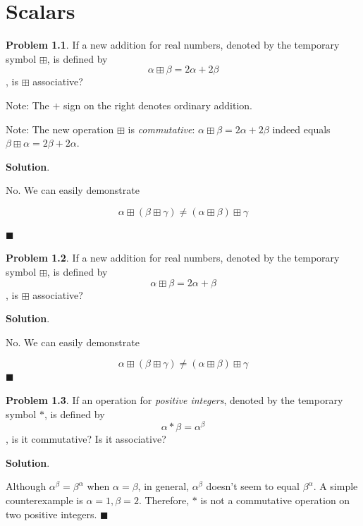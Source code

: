 \documentclass[english,notitlepage,smartquotes]{hgbreport}
\theoremstyle{definition}
\theoremstyle{problem}
\newtheorem{problem}{Problem}
\theoremstyle{remark}
\theoremstyle{plain}
\renewcommand\qedsymbol{$\blacksquare$}
\begin{document}
\tableofcontents

\chapter{Scalars}
\begin{problem}
\label{pr:2a2b}
If a new addition for real numbers, denoted by the temporary symbol $\boxplus$, is defined by
$$
\alpha\boxplus\beta=2\alpha+2\beta
$$
, is $\boxplus$ associative?

Note: The $+$ sign on the right denotes ordinary addition.

Note: The new operation $\boxplus$ is \textit{commutative}: $\alpha\boxplus\beta=2\alpha+2\beta$ indeed equals $\beta\boxplus\alpha=2\beta+2\alpha$.
\end{problem}

\textbf{Solution}.

No. We can easily demonstrate 

$$
\alpha\boxplus(\beta\boxplus\gamma)\ne(\alpha\boxplus\beta)\boxplus\gamma
$$


\qedsymbol

\begin{problem}
\label{pr:a2b}
If a new addition for real numbers, denoted by the temporary symbol $\boxplus$, is defined by
$$
\alpha\boxplus\beta=2\alpha+\beta
$$
, is $\boxplus$ associative?
\end{problem}

\textbf{Solution}.

No. We can easily demonstrate 

$$
\alpha\boxplus(\beta\boxplus\gamma)\ne(\alpha\boxplus\beta)\boxplus\gamma
$$
\qedsymbol

\begin{problem}
\label{pr:atob}
If an operation for \emph{positive integers}, denoted by the temporary symbol $*$, is defined by
$$
\alpha*\beta=\alpha^\beta
$$
, is it commutative? Is it associative?
\end{problem}

\textbf{Solution}.

Although $\alpha^\beta=\beta^\alpha$ when $\alpha=\beta$, in general, $\alpha^{\beta}$ doesn't seem to equal $\beta^\alpha$. A simple counterexample is $\alpha=1,\beta=2$. Therefore, $*$ is not a commutative operation on two positive integers.
\qedsymbol
\end{document}
